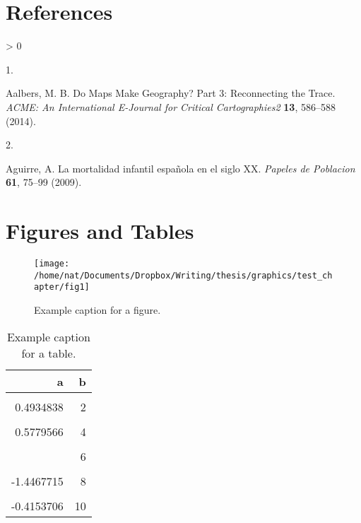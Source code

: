 \documentclass[
]{article}
\newlength{\cslhangindent}
\newlength{\csllabelwidth}
\newenvironment{CSLReferences}[2] %
 {%
  \setlength{\parindent}{0pt}
  \ifodd #1 \everypar{\setlength{\hangindent}{\cslhangindent}}\ignorespaces\fi
  \ifnum #2 > 0
  \setlength{\parskip}{#2\baselineskip}
  \fi
 }%
 {}
\newcommand{\CSLLeftMargin}[1]{\parbox[t]{\csllabelwidth}{#1}}
\newcommand{\CSLRightInline}[1]{\parbox[t]{\linewidth - \csllabelwidth}{#1}\break}
\begin{document}
\hypertarget{references}{%
\section{References}\label{references}}

\hypertarget{refs}{}
\begin{CSLReferences}{0}{0}
\leavevmode\hypertarget{ref-Aalbers}{}%
\CSLLeftMargin{1. }
\CSLRightInline{Aalbers, M. B. {Do Maps Make Geography? Part 3: Reconnecting the Trace}. \emph{ACME: An International E-Journal for Critical Cartographies2} \textbf{13}, 586--588 (2014).}

\leavevmode\hypertarget{ref-Aguirre2009}{}%
\CSLLeftMargin{2. }
\CSLRightInline{Aguirre, A. {La mortalidad infantil espa{ñ}ola en el siglo XX}. \emph{Papeles de Poblacion} \textbf{61}, 75--99 (2009).}

\end{CSLReferences}

\newpage

\hypertarget{figures-and-tables}{%
\section{Figures and Tables}\label{figures-and-tables}}

\begin{figure}[!ht]

{\centering \texttt{[image: /home/nat/Documents/Dropbox/Writing/thesis/graphics/test\_chapter/fig1]} 

}

\caption{Example caption for a figure.}\label{fig:fig1}
\end{figure}
\newpage

\begin{table}

\caption{\label{tab:t1}Example caption for a table.}
\centering
\begin{tabular}[t]{rr}
\toprule
a & b\\
\midrule
\cellcolor{gray!6}{-1.9089035} & \cellcolor{gray!6}{1}\\
0.4934838 & 2\\
\cellcolor{gray!6}{-1.2685774} & \cellcolor{gray!6}{3}\\
0.5779566 & 4\\
\cellcolor{gray!6}{-0.5309846} & \cellcolor{gray!6}{5}\\
\addlinespace
-1.2905178 & 6\\
\cellcolor{gray!6}{0.1389421} & \cellcolor{gray!6}{7}\\
-1.4467715 & 8\\
\cellcolor{gray!6}{-0.2152460} & \cellcolor{gray!6}{9}\\
-0.4153706 & 10\\
\bottomrule
\end{tabular}
\end{table}
\end{document}
